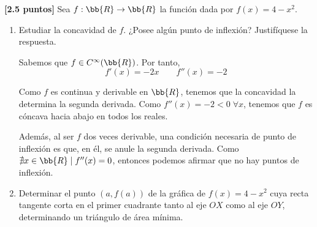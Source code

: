 \documentclass[12pt]{article}
\begin{document}
\begin{ejercicio} \textbf{[2.5 puntos]} Sea $f:\bb{R}\to \bb{R}$ la función dada por $f(x)=4-x^2$.
\begin{enumerate}
    \item Estudiar la concavidad de $f$. ¿Posee algún punto de inflexión? Justifíquese la respuesta.

    Sabemos que $f\in C^\infty (\bb{R})$. Por tanto,
    \begin{equation*}
        f'(x)=-2x \qquad f''(x)=-2
    \end{equation*}

    Como $f$ es continua y derivable en $\bb{R}$, tenemos que la concavidad la determina la segunda derivada. Como $f''(x)=-2<0\;\forall x$, tenemos que $f$ es cóncava hacia abajo en todos los reales.

    Además, al ser $f$ dos veces derivable, una condición necesaria de punto de inflexión es que, en él, se anule la segunda derivada. Como $\nexists x\in \bb{R}\mid f''(x)=0$, entonces podemos afirmar que no hay puntos de inflexión.

    \item Determinar el punto $(a, f(a))$ de la gráfica de $f(x)=4-x^2$ cuya recta tangente corta en el primer cuadrante tanto al eje $OX$ como al eje $OY$, determinando un triángulo de área mínima.

    \begin{figure}[H]
        \centering
\end{figure}
\end{enumerate}
\end{ejercicio}
\end{document}
